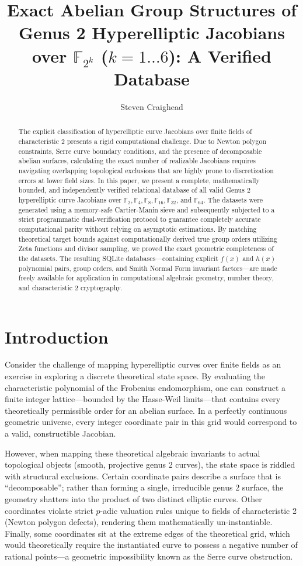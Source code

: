 \documentclass[12pt]{article}
\title{Exact Abelian Group Structures of Genus 2 Hyperelliptic Jacobians over $\mathbb{F}_{2^k}$ ($k=1 \dots 6$): A Verified Database}
\author{Steven Craighead}
\date{}
\begin{document}
\maketitle

\begin{abstract}
The explicit classification of hyperelliptic curve Jacobians over finite fields of characteristic 2 presents a rigid computational challenge. Due to Newton polygon constraints, Serre curve boundary conditions, and the presence of decomposable abelian surfaces, calculating the exact number of realizable Jacobians requires navigating overlapping topological exclusions that are highly prone to discretization errors at lower field sizes. In this paper, we present a complete, mathematically bounded, and independently verified relational database of all valid Genus 2 hyperelliptic curve Jacobians over $\mathbb{F}_2, \mathbb{F}_4, \mathbb{F}_8, \mathbb{F}_{16}, \mathbb{F}_{32}$, and $\mathbb{F}_{64}$. The datasets were generated using a memory-safe Cartier-Manin sieve and subsequently subjected to a strict programmatic dual-verification protocol to guarantee completely accurate computational parity without relying on asymptotic estimations. By matching theoretical target bounds against computationally derived true group orders utilizing Zeta functions and divisor sampling, we proved the exact geometric completeness of the datasets. The resulting SQLite databases---containing explicit $f(x)$ and $h(x)$ polynomial pairs, group orders, and Smith Normal Form invariant factors---are made freely available for application in computational algebraic geometry, number theory, and characteristic 2 cryptography.
\end{abstract}

\section{Introduction}
Consider the challenge of mapping hyperelliptic curves over finite fields as an exercise in exploring a discrete theoretical state space. By evaluating the characteristic polynomial of the Frobenius endomorphism, one can construct a finite integer lattice---bounded by the Hasse-Weil limits---that contains every theoretically permissible order for an abelian surface. In a perfectly continuous geometric universe, every integer coordinate pair in this grid would correspond to a valid, constructible Jacobian.

However, when mapping these theoretical algebraic invariants to actual topological objects (smooth, projective genus 2 curves), the state space is riddled with structural exclusions. Certain coordinate pairs describe a surface that is ``decomposable''; rather than forming a single, irreducible genus 2 surface, the geometry shatters into the product of two distinct elliptic curves. Other coordinates violate strict $p$-adic valuation rules unique to fields of characteristic 2 (Newton polygon defects), rendering them mathematically un-instantiable. Finally, some coordinates sit at the extreme edges of the theoretical grid, which would theoretically require the instantiated curve to possess a negative number of rational points---a geometric impossibility known as the Serre curve obstruction.
\end{document}
